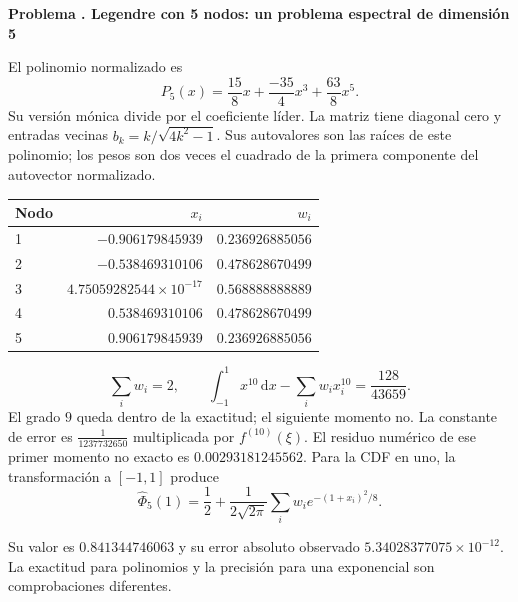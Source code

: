 \documentclass[11pt,a4paper]{article}
\newcommand{\dd}{\,\mathrm d}
\theoremstyle{definition}
\newcounter{problema}
\newenvironment{resuelto}[1]{\refstepcounter{problema}\par\medskip\Needspace{6\baselineskip}\textbf{Problema \theproblema. #1}\par}{\par\medskip}
\begin{document}
\begin{resuelto}{Legendre con 5 nodos: un problema espectral de dimensión 5}
El polinomio normalizado es
\[
P_{5}(x)=\frac{15}{8}x+\frac{-35}{4}x^{3}+\frac{63}{8}x^{5}.
\]
Su versión mónica divide por el coeficiente líder. La matriz tiene diagonal cero y entradas vecinas $b_k=k/\sqrt{4k^2-1}$. Sus autovalores son las raíces de este polinomio; los pesos son dos veces el cuadrado de la primera componente del autovector normalizado.

\begin{center}\small\begin{tabular}{lrr}
\toprule
Nodo & $x_i$ & $w_i$\\\midrule
1 & $-0.906179845939$ & $0.236926885056$\\
2 & $-0.538469310106$ & $0.478628670499$\\
3 & $4.75059282544\times10^{-17}$ & $0.568888888889$\\
4 & $0.538469310106$ & $0.478628670499$\\
5 & $0.906179845939$ & $0.236926885056$\\
\bottomrule\end{tabular}\end{center}

\[
\sum_iw_i=2,\qquad
\int_{-1}^1x^{10}\dd x-\sum_iw_ix_i^{10}
=\frac{128}{43659}.
\]
El grado $9$ queda dentro de la exactitud; el siguiente momento no. La constante de error es $\frac{1}{1237732650}$ multiplicada por $f^{(10)}(\xi)$. El residuo numérico de ese primer momento no exacto es $0.00293181245562$.
Para la CDF en uno, la transformación a $[-1,1]$ produce
\[
\widehat\Phi_{5}(1)=\frac12+
\frac1{2\sqrt{2\pi}}\sum_iw_i e^{-(1+x_i)^2/8}.
\]

Su valor es $0.841344746063$ y su error absoluto observado $5.34028377075\times10^{-12}$. La exactitud para polinomios y la precisión para una exponencial son comprobaciones diferentes.\end{resuelto}
\end{document}
